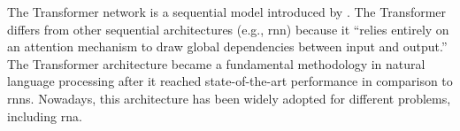 

The Transformer network is a sequential model introduced by
\textcite{vaswani2017attention}. The Transformer differs
from other sequential architectures (e.g., \gls{rnn})
because it ``relies entirely on an attention mechanism to
draw global dependencies between input and output.'' The
Transformer architecture became a fundamental methodology in
natural language processing after it reached
state-of-the-art performance in comparison to \glspl{rnn}.
Nowadays, this architecture has been widely adopted for
different problems, including \gls{rna}.
